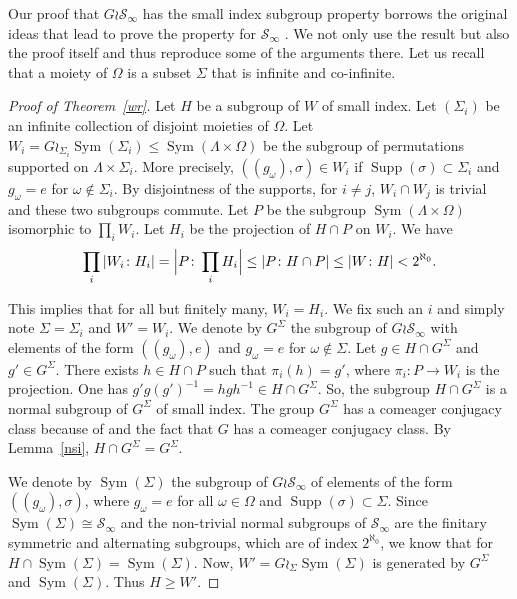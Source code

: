 \documentclass[11pt]{article}
\let\mathcal\mathscr
\theoremstyle{plain}
\theoremstyle{definition}
\newcommand{\cS}{\mathcal{S}}
\newcommand{\sinf}{\cS_\infty}
\DeclareMathOperator{\supp}{Supp}
\DeclareMathOperator{\Sym}{Sym}
\begin{document}
Our proof that $G\wr\sinf$ has the small index subgroup property borrows the original ideas that lead to prove the property for $\sinf$ \cite[Th.\,1]{MR859950}. We not only use the result but also the proof itself and thus reproduce some of the arguments there. Let us recall that a moiety of $\Omega$ is a subset $\Sigma$ that is infinite and co-infinite.

\begin{proof}[Proof of Theorem~\ref{wr}] Let $H$ be a subgroup of $W$ of small index. Let $(\Sigma_i)$ be an infinite collection of disjoint moieties of $\Omega$. Let $W_i=G\wr_{\Sigma_i} \Sym(\Sigma_i)\leq\Sym(\Lambda\times \Omega)$ be the subgroup of permutations supported on $\Lambda\times\Sigma_i$. More precisely, $\left((g_\omega),\sigma\right)\in W_i$ if $\supp(\sigma)\subset \Sigma_i$ and $g_\omega=e$ for $\omega\notin \Sigma_i$. By disjointness of the supports, for $i\neq j$, $W_i\cap W_j$ is trivial and these two subgroups commute. Let $P$ be the subgroup $\Sym(\Lambda\times \Omega)$ isomorphic to $\prod_i W_i$. Let $H_i$ be the projection of $H\cap P$ on $W_i$. We have
\[
\prod_{i}|W_i\colon H_i|=\Bigl|P\colon \prod_{i}H_i\Bigr|\leq|P\colon H\cap P|\leq|W\colon H|<2^{\aleph_0}.
\]

This implies that for all but finitely many, $W_i=H_i$. We fix such an $i$ and simply note $\Sigma=\Sigma_i$ and $W'=W_i$. We denote by $G^\Sigma$ the subgroup of $G\wr\sinf$ with elements of the form $((g_\omega),e)$ and $g_\omega=e$ for $\omega\notin \Sigma$. Let $g\in H\cap G^\Sigma$ and $g'\in G^\Sigma$. There exists $h\in H\cap P$ such that $\pi_i(h)=g'$, where $\pi_i\colon P\to W_i$ is the projection. One has $g'g(g')^{-1}= hgh^{-1}\in H\cap G^\Sigma$. So, the subgroup $H\cap G^\Sigma$ is a normal subgroup of $G^\Sigma$ of small index. The group $G^\Sigma$ has a comeager conjugacy class because of \cite[Lem.\,11]{Rosendal-Solecki} and the fact that $G$ has a comeager conjugacy class. By Lemma~\ref{nsi}, $H\cap G^\Sigma=G^\Sigma$.

We denote by $\Sym(\Sigma)$ the subgroup of $G\wr\sinf$ of elements of the form $((g_\omega),\sigma)$, where $g_\omega=e$ for all $\omega\in\Omega$ and $\supp(\sigma)\subset \Sigma$. Since $\Sym(\Sigma)\cong\sinf$ and the non-trivial normal subgroups of $\sinf$ are the finitary symmetric and alternating subgroups, which are of index $2^{\aleph_0}$, we know that for $H\cap \Sym(\Sigma)=\Sym(\Sigma)$. Now, $W'=G\wr_\Sigma\Sym(\Sigma)$ is generated by $G^\Sigma$ and $\Sym(\Sigma)$. Thus $H\geq W'$.


\end{proof}
\end{document}
